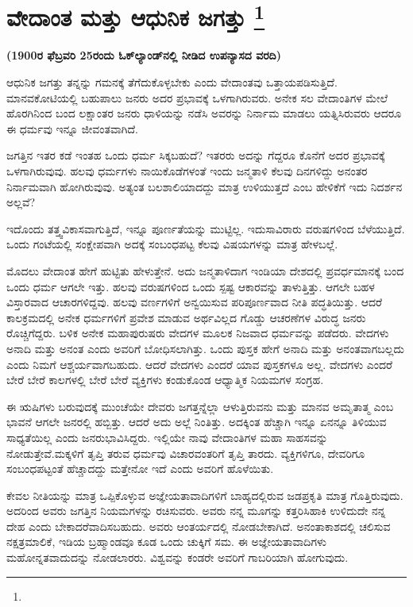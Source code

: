 
\chapter[ವೇದಾಂತ ಮತ್ತು ಆಧುನಿಕ ಜಗತ್ತು ]{ವೇದಾಂತ ಮತ್ತು ಆಧುನಿಕ ಜಗತ್ತು \protect\footnote{}}

\centerline{\textbf{(1900ರ ಫೆಬ್ರವರಿ 25ರಂದು ಓಕ್​ಲ್ಯಾಂಡ್​ನಲ್ಲಿ ನೀಡಿದ ಉಪನ್ಯಾಸದ ವರದಿ)}}

\vskip 0.3cm

ಆಧುನಿಕ ಜಗತ್ತು ತನ್ನನ್ನು ಗಮನಕ್ಕೆ ತೆಗೆದುಕೊಳ್ಳಬೇಕು ಎಂದು ವೇದಾಂತವು ಒತ್ತಾಯಪಡಿಸುತ್ತಿದೆ. ಮಾನವಕೋಟಿಯಲ್ಲಿ ಬಹುಪಾಲು ಜನರು ಅದರ ಪ್ರಭಾವಕ್ಕೆ ಒಳಗಾಗಿರುವರು. ಅನೇಕ ಸಲ ವೇದಾಂತಿಗಳ ಮೇಲೆ ಹೊರಗಿನಿಂದ ಬಂದ ಲಕ್ಷಾಂತರ ಜನರು ಧಾಳಿಯನ್ನು ನಡೆಸಿ ಅವರನ್ನು ನಿರ್ನಾಮ ಮಾಡಲು ಯತ್ನಿಸಿರುವರು ಆದರೂ ಈ ಧರ್ಮವು ಇನ್ನೂ ಜೀವಂತವಾಗಿದೆ.

ಜಗತ್ತಿನ ಇತರ ಕಡೆ ಇಂತಹ ಒಂದು ಧರ್ಮ ಸಿಕ್ಕಬಹುದೆ? ಇತರರು ಅದನ್ನು ಗೆದ್ದರೂ ಕೊನೆಗೆ ಅದರ ಪ್ರಭಾವಕ್ಕೆ ಒಳಗಾಗಿರುವುವು. ಹಲವು ಧರ್ಮಗಳು ನಾಯಿಕೊಡೆಗಳಂತೆ ಇಂದು ಜನ್ಮತಾಳಿ ಕೆಲವು ದಿನಗಳಿದ್ದು ಅನಂತರ ನಿರ್ನಾಮವಾಗಿ ಹೋಗಿರುವುವು. ಅತ್ಯಂತ ಬಲಶಾಲಿಯಾದದ್ದು ಮಾತ್ರ ಉಳಿಯುತ್ತದೆ ಎಂಬ ಹೇಳಿಕೆಗೆ ಇದು ನಿದರ್ಶನ ಅಲ್ಲವೆ?

ಇದೊಂದು ತತ್ತ್ವವಿಕಾಸವಾಗುತ್ತಿದೆ, ಇನ್ನೂ ಪೂರ್ಣತೆಯನ್ನು ಮುಟ್ಟಿಲ್ಲ. ಇದು\break ಸಾವಿರಾರು ವರುಷಗಳಿಂದ ಬೆಳೆಯುತ್ತಿದೆ. ಒಂದು ಗಂಟೆಯಲ್ಲಿ ಸಂಕ್ಷೇಪವಾಗಿ ಅದಕ್ಕೆ ಸಂಬಂಧಪಟ್ಟ ಕೆಲವು ವಿಷಯಗಳನ್ನು ಮಾತ್ರ ಹೇಳಬಲ್ಲೆ.

ಮೊದಲು ವೇದಾಂತ ಹೇಗೆ ಹುಟ್ಟಿತು ಹೇಳುತ್ತೇನೆ. ಅದು ಜನ್ಮತಾಳಿದಾಗ ಇಂಡಿಯಾ ದೇಶದಲ್ಲಿ ಪ್ರವರ್ಧಮಾನಕ್ಕೆ ಬಂದ ಒಂದು ಧರ್ಮ ಆಗಲೇ ಇತ್ತು. ಹಲವು ವರುಷಗಳಿಂದ ಒಂದು ಸ್ಪಷ್ಟ ಆಕಾರವನ್ನು ತಾಳುತ್ತಿತ್ತು. ಆಗಲೇ ಬಹಳ ವಿಸ್ತಾರವಾದ ಆಚಾರಗಳಿದ್ದವು. ಹಲವು ವರ್ಣಗಳಿಗೆ ಅನ್ವಯಿಸುವ ಪರಿಪೂರ್ಣವಾದ ನೀತಿ ಪದ್ಧತಿಯಿತ್ತು. ಆದರೆ ಕಾಲಕ್ರಮದಲ್ಲಿ ಅನೇಕ ಧರ್ಮಗಳಿಗೆ ಪ್ರವೇಶ ಮಾಡುವ ಅರ್ಥವಿಲ್ಲದ ಗೊಡ್ಡು ಆಚರಣೆಗಳ ವಿರುದ್ಧ ಜನರು ರೊಚ್ಚಿಗೆದ್ದರು. ಬಳಿಕ ಅನೇಕ ಮಹಾಪುರುಷರು ವೇದಗಳ ಮೂಲಕ ನಿಜವಾದ ಧರ್ಮವನ್ನು ಪಡೆದರು. ವೇದಗಳು ಅನಾದಿ ಮತ್ತು ಅನಂತ ಎಂದು ಅವರಿಗೆ ಬೋಧಿಸಲಾಗಿತ್ತು. ಒಂದು ಪುಸ್ತಕ ಹೇಗೆ ಅನಾದಿ ಮತ್ತು ಅನಂತವಾಗಬಲ್ಲದು ಎಂದು ನಿಮಗೆ ಆಶ್ಚರ್ಯವಾಗಬಹುದು. ಆದರೆ ವೇದಗಳು ಎಂದರೆ ಯಾವ ಪುಸ್ತಕಗಳೂ ಅಲ್ಲ. ವೇದಗಳು ಎಂದರೆ ಬೇರೆ ಬೇರೆ ಕಾಲಗಳಲ್ಲಿ ಬೇರೆ ಬೇರೆ ವ್ಯಕ್ತಿಗಳು ಕಂಡುಕೊಂಡ ಆಧ್ಯಾತ್ಮಿಕ ನಿಯಮಗಳ ಸಂಗ್ರಹ.

ಈ ಋಷಿಗಳು ಬರುವುದಕ್ಕೆ ಮುಂಚೆಯೇ ದೇವರು ಜಗತ್ತನ್ನೆಲ್ಲಾ ಆಳುತ್ತಿರುವನು ಮತ್ತು ಮಾನವ ಅಮೃತಾತ್ಮ ಎಂಬ ಭಾವನೆ ಆಗಲೇ ಜನರಲ್ಲಿ ಹಬ್ಬಿತ್ತು. ಆದರೆ ಅದು ಅಲ್ಲೆ ನಿಂತಿತ್ತು. ಅದಕ್ಕಿಂತ ಹೆಚ್ಚಾಗಿ ಇನ್ನೂ ಏನನ್ನೂ ತಿಳಿಯುವ ಸಾಧ್ಯತೆಯಿಲ್ಲ ಎಂದು ಜನರು\break ಭಾವಿಸಿದ್ದರು. ಇಲ್ಲಿಯೇ ನಾವು ವೇದಾಂತಿಗಳ ಮಹಾ ಸಾಹಸವನ್ನು ನೋಡುತ್ತೇವೆ.\break ಮಕ್ಕಳಿಗೆ ತೃಪ್ತಿ ತರುವ ಧರ್ಮವು ವಿಚಾರವಂತರಿಗೆ ತೃಪ್ತಿ ತಾರದು. ವ್ಯಕ್ತಿಗಳಿಗೂ, ದೇವರಿಗೂ ಸಂಬಂಧಪಟ್ಟಂತೆ ಹೆಚ್ಚಾದದ್ದು ಮತ್ತೇನೋ ಇದೆ ಎಂದು ಅವರಿಗೆ ಹೊಳೆಯಿತು.

ಕೇವಲ ನೀತಿಯನ್ನು ಮಾತ್ರ ಒಪ್ಪಿಕೊಳ್ಳುವ ಅಜ್ಞೇಯತಾವಾದಿಗಳಿಗೆ ಬಾಹ್ಯದಲ್ಲಿರುವ ಜಡಪ್ರಕೃತಿ ಮಾತ್ರ ಗೊತ್ತಿರುವುದು. ಅದರಿಂದ ಅವರು ಜಗತ್ತಿನ ನಿಯಮಗಳನ್ನು ರಚಿಸುವರು. ಅವರು ನನ್ನ ಮೂಗನ್ನು ಕತ್ತರಿಸಿಹಾಕಿ ಉಳಿದುದೇ ನನ್ನ ದೇಹ ಎಂದು ಬೇಕಾದರೆ\break ವಾದಿಸಬಹುದು. ಅವರು ಆಂತರ್ಯದಲ್ಲಿ ನೋಡಬೇಕಾಗಿದೆ. ಅನಂತಾಕಾಶದಲ್ಲಿ ಚಲಿಸುವ ನಕ್ಷತ್ರಮಾಲಿಕೆ, ಇಡಿಯ ಬ್ರಹ್ಮಾಂಡವೂ ಕೂಡ ಒಂದು ಚುಕ್ಕಿಗೆ ಸಮ. ಈ ಅಜ್ಞೇಯತಾವಾದಿಗಳು ಮಹೋನ್ನತವಾದುದನ್ನು ನೋಡಲಾರರು. ವಿಶ್ವವನ್ನು ಕಂಡರೇ ಅವರಿಗೆ ಗಾಬರಿಯಾಗಿ ಹೋಗುವುದು.

